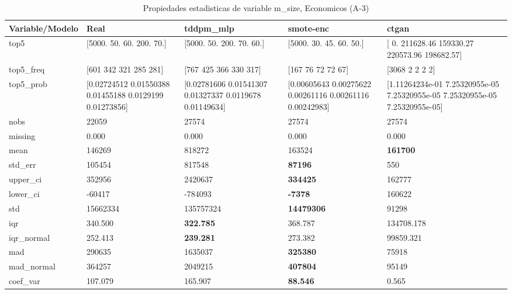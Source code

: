\begin{table}[H]
\centering
\fontsize{8}{14}\selectfont
\caption{Propiedades  estadisticas de variable m\_size, Economicos (A-3)}
\label{table-stats-economicos-a-3-m_size}
\begin{tabular}{|l|m{10em}|m{10em}|m{10em}|m{10em}|}
\hline
 \rowcolor[gray]{0.8}
Variable/Modelo & Real & tddpm\_mlp & smote-enc & ctgan \\
\hline top5 & [5000.   50.   60.  200.   70.] & [5000.   50.  200.   70.   60.] & [5000.   30.   45.   60.   50.] & [     0.   211628.46 159330.27 220573.96 198682.57] \\
\hline top5\_freq & [601 342 321 285 281] & [767 425 366 330 317] & [167  76  72  72  67] & [3068    2    2    2    2] \\
\hline top5\_prob & [0.02724512 0.01550388 0.01455188 0.0129199  0.01273856] & [0.02781606 0.01541307 0.01327337 0.0119678  0.01149634] & [0.00605643 0.00275622 0.00261116 0.00261116 0.00242983] & [1.11264234e-01 7.25320955e-05 7.25320955e-05 7.25320955e-05
 7.25320955e-05] \\
\hline nobs & 22059 & 27574 & 27574 & 27574 \\
\hline missing & 0.000 & 0.000 & 0.000 & 0.000 \\
\hline mean & 146269 & \cellcolor[rgb]{0.9, 0.54, 0.52} 818272 & 163524 & \bfseries 161700 \\
\hline std\_err & 105454 & \cellcolor[rgb]{0.9, 0.54, 0.52} 817548 & \bfseries 87196 & 550 \\
\hline upper\_ci & 352956 & \cellcolor[rgb]{0.9, 0.54, 0.52} 2420637 & \bfseries 334425 & 162777 \\
\hline lower\_ci & -60417 & \cellcolor[rgb]{0.9, 0.54, 0.52} -784093 & \bfseries -7378 & 160622 \\
\hline std & 15662334 & \cellcolor[rgb]{0.9, 0.54, 0.52} 135757324 & \bfseries 14479306 & 91298 \\
\hline iqr & 340.500 & \bfseries 322.785 & 368.787 & \cellcolor[rgb]{0.9, 0.54, 0.52} 134708.178 \\
\hline iqr\_normal & 252.413 & \bfseries 239.281 & 273.382 & \cellcolor[rgb]{0.9, 0.54, 0.52} 99859.321 \\
\hline mad & 290635 & \cellcolor[rgb]{0.9, 0.54, 0.52} 1635037 & \bfseries 325380 & 75918 \\
\hline mad\_normal & 364257 & \cellcolor[rgb]{0.9, 0.54, 0.52} 2049215 & \bfseries 407804 & 95149 \\
\hline coef\_var & 107.079 & 165.907 & \bfseries 88.546 & \cellcolor[rgb]{0.9, 0.54, 0.52} 0.565 \\

\end{tabular}
\end{table}
